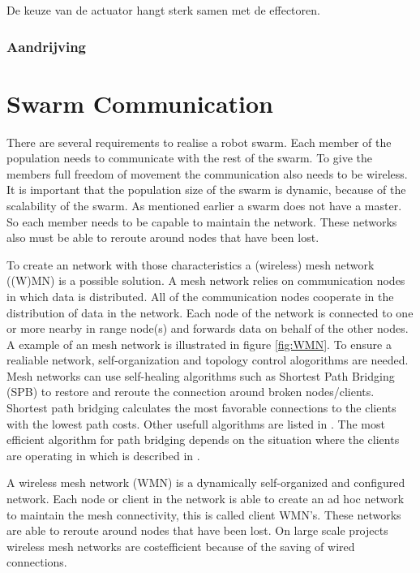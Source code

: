 \documentclass[10pt,a4paper]{article}
\begin{document}
De keuze van de actuator hangt sterk samen met de effectoren.

\subsubsection{Aandrijving}

\newpage
\section{Swarm Communication}
There are several requirements to realise a robot swarm. Each member of the population needs to communicate with the rest of the swarm. To give the members full freedom of movement the communication also needs to be wireless. It is important that the population size of the swarm is dynamic, because of the scalability of the swarm. As mentioned earlier a swarm does not have a master. So each member needs to be capable to maintain the network. These networks also must be able to reroute around nodes that have been lost.

To create an network with those characteristics a (wireless) mesh network ((W)MN) is a possible solution. A mesh network relies on communication nodes in which data is distributed. All of the communication nodes cooperate in the distribution of data in the network. Each node of the network is connected to one or more nearby in range node(s) and forwards data on behalf of the other nodes. \cite{meshnetworking} A example of an mesh network is illustrated in figure \ref{fig:WMN}. To ensure a realiable network, self-organization and topology control alogorithms are needed.\cite{WMN1} Mesh networks can use self-healing algorithms such as Shortest Path Bridging (SPB) to restore and reroute the connection around broken nodes/clients. Shortest path bridging calculates the most favorable connections to the clients with the lowest path costs. \cite{SPB} Other usefull algorithms are listed in \cite{position-based}. The most efficient algorithm for path bridging depends on the situation where the clients are operating in which is described in \cite{position-based}.

A wireless mesh network (WMN) is a dynamically self-organized and configured network. \cite{WMN1} Each node or client in the network is able to create an ad hoc network to maintain the mesh connectivity, this is called client WMN's. These networks are able to reroute around nodes that have been lost. On large scale projects wireless mesh networks are costefficient because of the saving of wired connections.\cite{meshnetworking}
\end{document}
